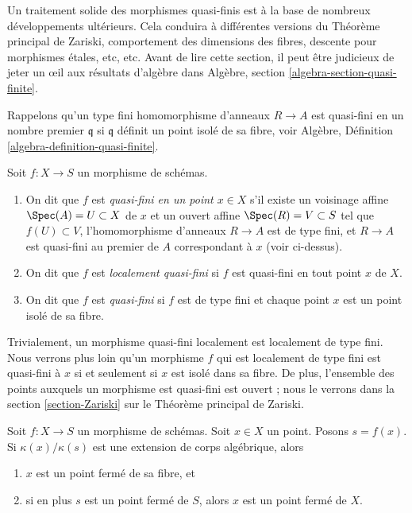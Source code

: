 \noindent
Un traitement solide des morphismes quasi-finis est à la base de nombreux développements
ultérieurs. Cela conduira à différentes versions du Théorème principal
de Zariski, comportement des dimensions des fibres, descente pour morphismes
étales, etc, etc. Avant de lire cette section, il peut être judicieux
de jeter un œil aux résultats d'algèbre dans Algèbre, section \ref{algebra-section-quasi-finite}.

\medskip\noindent
Rappelons qu'un type fini homomorphisme d'anneaux $R \to A$
est quasi-fini en un nombre premier $\mathfrak q$ si $\mathfrak q$
définit un point isolé de sa fibre, voir Algèbre, Définition \ref{algebra-definition-quasi-finite}.

\begin{definition}
\label{definition-quasi-finite}
\begin{reference}
\cite[II Définition 6.2.3]{EGA}
\end{reference}
Soit $f : X \to S$ un morphisme de schémas.
\begin{enumerate}
\item On dit que $f$ est {\it quasi-fini en un point
$x \in X$} s'il existe un voisinage affine $\Spec(A) = U \subset X$
de $x$ et un ouvert affine $\Spec(R) = V \subset S$ tel que $f(U) \subset V$,
l'homomorphisme d'anneaux $R \to A$ est de type fini, et $R \to A$
est quasi-fini au premier de $A$ correspondant à $x$ (voir
ci-dessus).
\item On dit que $f$ est {\it localement quasi-fini} si $f$
est quasi-fini en tout point $x$ de $X$.
\item On dit que $f$ est {\it quasi-fini} si $f$ est
de type fini et chaque point $x$ est un point isolé de sa fibre.
\end{enumerate}
\end{definition}

\noindent
Trivialement, un morphisme quasi-fini localement est localement de type fini. Nous
verrons plus loin qu'un morphisme $f$ qui est localement de type fini
est quasi-fini à $x$ si et seulement si $x$ est isolé dans sa
fibre. De plus, l'ensemble des points auxquels un morphisme est quasi-fini est ouvert
; nous le verrons dans la section \ref{section-Zariski} sur le Théorème principal de Zariski.

\begin{lemma}
\label{lemma-algebraic-residue-field-extension-closed-point-fibre}
Soit $f : X \to S$ un morphisme de schémas. Soit
$x \in X$ un point. Posons $s = f(x)$.
Si $\kappa(x)/\kappa(s)$ est une
extension de corps algébrique, alors
\begin{enumerate}
\item $x$ est un point fermé de sa fibre, et
\item si en plus $s$ est un point fermé de $S$, alors $x$
est un point fermé de $X$.
\end{enumerate}
\end{lemma}

